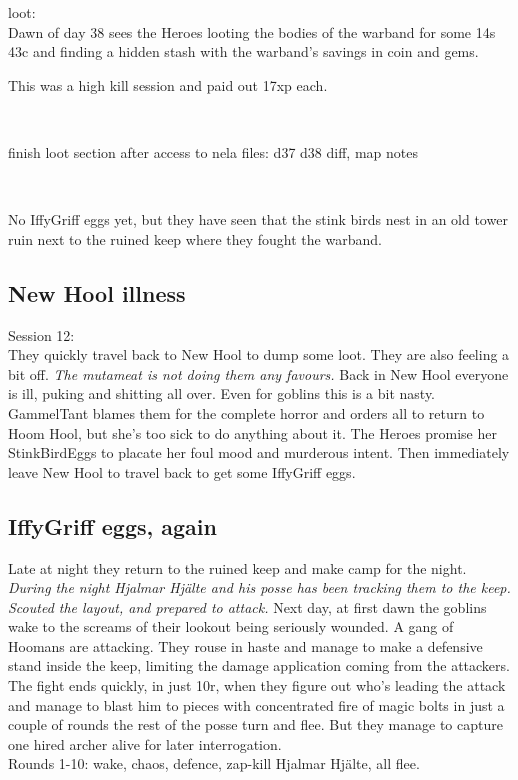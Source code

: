 loot:\\
Dawn of day 38 sees the Heroes looting the bodies of the warband for some 14s 43c and finding a hidden stash with the warband's savings in coin and gems.

This was a high kill session and paid out 17xp each.

\

\todo finish loot section after access to nela files: d37 d38 diff, map notes

\

No IffyGriff eggs yet, but they have seen that the stink birds nest in an old tower ruin next to the ruined keep where they fought the warband.


\subsection*{New Hool illness}

\forceindent Session 12:\\                                       %
They quickly travel back to New Hool to dump some loot. They are also feeling a bit off. \emph{The mutameat is not doing them any favours.} Back in New Hool everyone is ill, puking and shitting all over. Even for goblins this is a bit nasty. GammelTant blames them for the complete horror and orders all to return to Hoom Hool, but she's too sick to do anything about it. The Heroes promise her StinkBirdEggs to placate her foul mood and murderous intent. Then immediately leave New Hool to travel back to get some IffyGriff eggs.


\subsection*{IffyGriff eggs, again}

Late at night they return to the ruined keep and make camp for the night.
\emph{During the night Hjalmar Hjälte and his posse has been tracking them to the keep. Scouted the layout, and prepared to attack.}
Next day, at first dawn the goblins wake to the screams of their lookout being seriously wounded. A gang of Hoomans are attacking. They rouse in haste and manage to make a defensive stand inside the keep, limiting the damage application coming from the attackers. The fight ends quickly, in just 10r, when they figure out who's leading the attack and manage to blast him to pieces with concentrated fire of magic bolts in just a couple of rounds the rest of the posse turn and flee. But they manage to capture one hired archer alive for later interrogation.\\
Rounds 1-10: wake, chaos, defence, zap-kill Hjalmar Hjälte, all flee.

